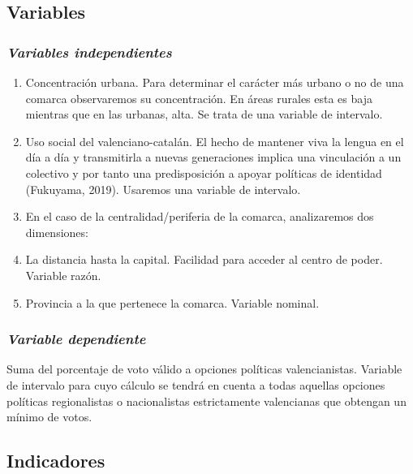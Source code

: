 \documentclass[
]{article}
\providecommand{\tightlist}{%
  \setlength{\itemsep}{0pt}\setlength{\parskip}{0pt}}
\begin{document}
\hypertarget{variables}{%
\subsection{Variables}\label{variables}}

\hypertarget{variables-independientes}{%
\subsubsection{\texorpdfstring{\emph{Variables
independientes}}{Variables independientes}}\label{variables-independientes}}

\begin{enumerate}
\def\labelenumi{\arabic{enumi}.}
\tightlist
\item
  Concentración urbana. Para determinar el carácter más urbano o no de
  una comarca observaremos su concentración. En áreas rurales esta es
  baja mientras que en las urbanas, alta. Se trata de una variable de
  intervalo.
\item
  Uso social del valenciano-catalán. El hecho de mantener viva la lengua
  en el día a día y transmitirla a nuevas generaciones implica una
  vinculación a un colectivo y por tanto una predisposición a apoyar
  políticas de identidad (Fukuyama, 2019). Usaremos una variable de
  intervalo.
\item
  En el caso de la centralidad/periferia de la comarca, analizaremos dos
  dimensiones:
\item
  La distancia hasta la capital. Facilidad para acceder al centro de
  poder. Variable razón.
\item
  Provincia a la que pertenece la comarca. Variable nominal.
\end{enumerate}

\hypertarget{variable-dependiente}{%
\subsubsection{\texorpdfstring{\emph{Variable
dependiente}}{Variable dependiente}}\label{variable-dependiente}}

Suma del porcentaje de voto válido a opciones políticas valencianistas.
Variable de intervalo para cuyo cálculo se tendrá en cuenta a todas
aquellas opciones políticas regionalistas o nacionalistas estrictamente
valencianas que obtengan un mínimo de votos.

\hypertarget{indicadores}{%
\subsection{Indicadores}\label{indicadores}}
\end{document}

